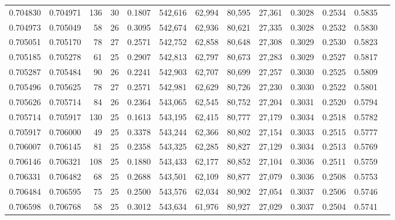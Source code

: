 \begin{tabular}{rrrrrrrrrrrrr}
0.704830 & 0.704971 &   136 &  30 &                                     0.1807 & 542,616 &  62,994 &  80,595 &  27,361 & 0.3028 & 0.2534 & 0.5835 \\
0.704973 & 0.705049 &    58 &  26 &                                     0.3095 & 542,674 &  62,936 &  80,621 &  27,335 & 0.3028 & 0.2532 & 0.5830 \\
0.705051 & 0.705170 &    78 &  27 &                                     0.2571 & 542,752 &  62,858 &  80,648 &  27,308 & 0.3029 & 0.2530 & 0.5823 \\
0.705185 & 0.705278 &    61 &  25 &                                     0.2907 & 542,813 &  62,797 &  80,673 &  27,283 & 0.3029 & 0.2527 & 0.5817 \\
0.705287 & 0.705484 &    90 &  26 &                                     0.2241 & 542,903 &  62,707 &  80,699 &  27,257 & 0.3030 & 0.2525 & 0.5809 \\
0.705496 & 0.705625 &    78 &  27 &                                     0.2571 & 542,981 &  62,629 &  80,726 &  27,230 & 0.3030 & 0.2522 & 0.5801 \\
0.705626 & 0.705714 &    84 &  26 &                                     0.2364 & 543,065 &  62,545 &  80,752 &  27,204 & 0.3031 & 0.2520 & 0.5794 \\
0.705714 & 0.705917 &   130 &  25 &                                     0.1613 & 543,195 &  62,415 &  80,777 &  27,179 & 0.3034 & 0.2518 & 0.5782 \\
0.705917 & 0.706000 &    49 &  25 &                                     0.3378 & 543,244 &  62,366 &  80,802 &  27,154 & 0.3033 & 0.2515 & 0.5777 \\
0.706007 & 0.706145 &    81 &  25 &                                     0.2358 & 543,325 &  62,285 &  80,827 &  27,129 & 0.3034 & 0.2513 & 0.5769 \\
0.706146 & 0.706321 &   108 &  25 &                                     0.1880 & 543,433 &  62,177 &  80,852 &  27,104 & 0.3036 & 0.2511 & 0.5759 \\
0.706331 & 0.706482 &    68 &  25 &                                     0.2688 & 543,501 &  62,109 &  80,877 &  27,079 & 0.3036 & 0.2508 & 0.5753 \\
0.706484 & 0.706595 &    75 &  25 &                                     0.2500 & 543,576 &  62,034 &  80,902 &  27,054 & 0.3037 & 0.2506 & 0.5746 \\
0.706598 & 0.706768 &    58 &  25 &                                     0.3012 & 543,634 &  61,976 &  80,927 &  27,029 & 0.3037 & 0.2504 & 0.5741 \\

\end{tabular}
